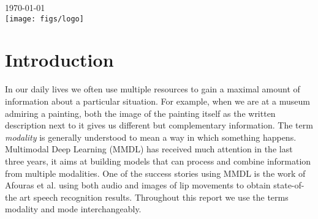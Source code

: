 \documentclass[12pt]{report}
\begin{document}
\begin{titlepage}

{\large \today}\\[2cm] %


\texttt{[image: figs/logo]}\\[1cm] %
 

\vfill %

\end{titlepage}

\tableofcontents
\clearpage

\section{Introduction}
\indent In our daily lives we often use multiple resources to gain a maximal amount of information about a particular situation. For example, when we are at a museum admiring a painting, both the image of the painting itself as the written description next to it gives us different but complementary information. The term \textit{modality} is generally understood to mean a way in which something happens. Multimodal Deep Learning (MMDL) has received much attention in the last three years\cite{afouras, jaiswal, liu-kuan}, it aims at building models that can process and combine information from multiple modalities. One of the success stories using MMDL is the work of Afouras et al.\cite{afouras} using both audio and images of lip movements to obtain state-of-the art speech recognition results. Throughout this report we use the terms modality and mode interchangeably.\\
\end{document}
